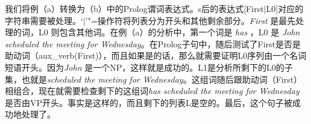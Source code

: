 \zl
%
我们将例（a）转换为（b）中的Prolog谓词表达式。s后的表达式[First$|$L0]对应的字符串需要被处理。`$|$'"=操作符将列表分为开头和其他剩余部分。\emph{First} 是最先处理的词，L0 则包含其他词。在例（a）的分析中，第一个词是 \emph{has} ，L0 是 \emph{John scheduled the meeting for Wednesday}。在Prolog子句中，随后测试了First是否是助动词（aux\_verb(First)），而且如果是的话，那么就需要证明L0序列由一个名词短语开头。因为\emph{John} 是一个NP，这样就是成功的。L1是分析所剩下的L0的子集，也就是\emph{scheduled the meeting for Wednesday}。这组词随后跟助动词（First）相组合，现在就需要检查剩下的这组词\emph{has scheduled the meeting for Wednesday} 是否由VP开头。事实是这样的，而且剩下的列表L是空的。最后，这个句子被成功地处理了。

